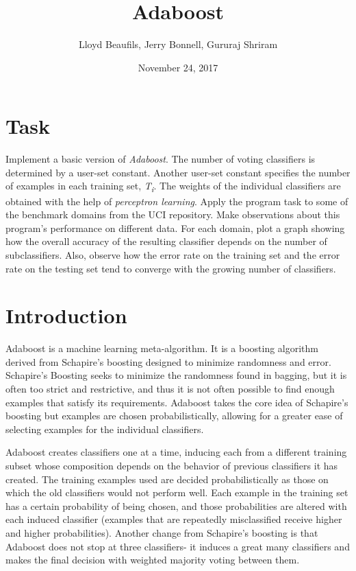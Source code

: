 \documentclass{article}
\title{Adaboost}
\author{Lloyd Beaufils, Jerry Bonnell, Gururaj Shriram}
\date{November 24, 2017}
\begin{document}
\maketitle

\section{Task}

Implement a basic version of \textit{Adaboost}. The number of voting classifiers is determined by a user-set constant. Another user-set constant specifies the number of examples in each training set, \textit{T\textsubscript{i}}. The weights of the individual classifiers are obtained with the help of \textit{perceptron learning}. Apply the program task to some of the benchmark domains from the UCI repository. Make observations about this program's performance on different data. For each domain, plot a graph showing how the overall accuracy of the resulting classifier depends on the number of subclassifiers. Also, observe how the error rate on the training set and the error rate on the testing set tend to converge with the growing number of classifiers.

\section{Introduction}

Adaboost is a machine learning meta-algorithm. It is a boosting algorithm derived from Schapire's boosting designed to minimize randomness and error. Schapire's Boosting seeks to minimize the randomness found in bagging, but it is often too strict and restrictive, and thus it is not often possible to find enough examples that satisfy its requirements. Adaboost takes the core idea of Schapire's boosting but examples are chosen probabilistically, allowing for a greater ease of selecting examples for the individual classifiers.

Adaboost creates classifiers one at a time, inducing each from a different training subset whose composition depends on the behavior of previous classifiers it has created. The training examples used are decided probabilistically as those on which the old classifiers would not perform well. Each example in the training set has a certain probability of being chosen, and those probabilities are altered with each induced classifier (examples that are repeatedly misclassified receive higher and higher probabilities). Another change from Schapire's boosting is that Adaboost does not stop at three classifiers- it induces a great many classifiers and makes the final decision with weighted majority voting between them.
\end{document}
